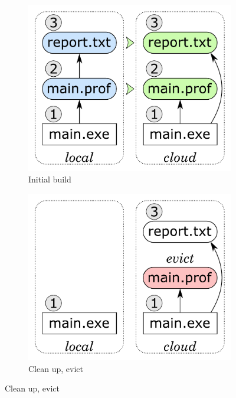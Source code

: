 \begin{figure}
\begin{subfigure}[b]{0.31\linewidth}
\centerline{\includegraphics[scale=0.27]{fig/frankenbuild-example-build.pdf}}
\caption{Initial build}
\end{subfigure}
\begin{subfigure}[b]{0.31\linewidth}
\centerline{\includegraphics[scale=0.27]{fig/frankenbuild-example-clean.pdf}}
\caption{Clean up, evict }

\end{subfigure}
\end{figure}

